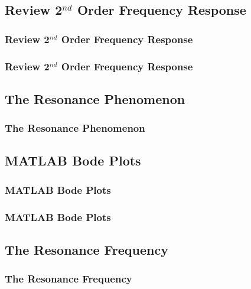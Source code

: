 \documentclass[fleqn]{beamer} %
\newcommand{\sectionIVsubsectionItitle}{Review 2$^{nd}$ Order Frequency Response}
\newcommand{\sectionIVsubsectionIItitle}{The Resonance Phenomenon}
\newcommand{\sectionIVsubsectionIIItitle}{The Resonance Frequency}
\newcommand{\sectionIVsubsectionIVtitle}{MATLAB Bode Plots}
\begin{document}
		\subsection{\sectionIVsubsectionItitle}\label{sectionIVsubsectionI}

			\begin{frame}
				\frametitle{\sectionIVsubsectionItitle}
				\bigskip


				\btVFill
			\end{frame}

			\begin{frame}
				\frametitle{\sectionIVsubsectionItitle}
				\bigskip
				

				\btVFill
			\end{frame}

		\subsection{\sectionIVsubsectionIItitle}\label{sectionIVsubsectionII}	

			\begin{frame}
				\frametitle{\sectionIVsubsectionIItitle}
				\bigskip

	
				\btVFill
			\end{frame}

		\subsection{\sectionIVsubsectionIVtitle}\label{sectionIVsubsectionIV}

			\begin{frame}
				\frametitle{\sectionIVsubsectionIVtitle}
				\bigskip

		
			
				\btVFill
			\end{frame}

			\begin{frame}
				\frametitle{\sectionIVsubsectionIVtitle}
				\bigskip

			
				\btVFill
			\end{frame}

		\subsection{\sectionIVsubsectionIIItitle}\label{sectionIIIsubsectionIV}	

			\begin{frame}
				\frametitle{\sectionIVsubsectionIIItitle}
				\bigskip

				

				\btVFill 
			\end{frame}
\end{document}
